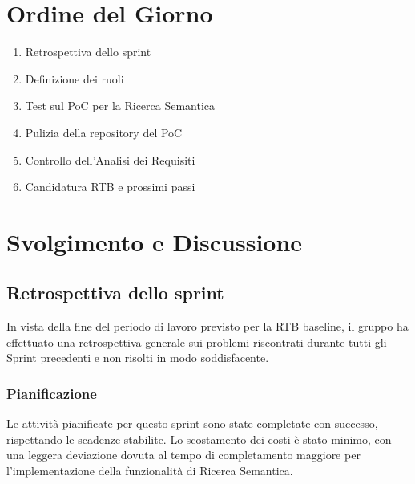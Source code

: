 \documentclass[a4paper,12pt]{article}
\begin{document}
\section{Ordine del Giorno}
\begin{enumerate}[noitemsep]
    \item Retrospettiva dello sprint 
    \item Definizione dei ruoli
    \item Test sul PoC per la Ricerca Semantica
    \item Pulizia della repository del PoC
    \item Controllo dell'Analisi dei Requisiti
    \item Candidatura RTB e prossimi passi
\end{enumerate}


\section{Svolgimento e Discussione}

\subsection{Retrospettiva dello sprint}
In vista della fine del periodo di lavoro previsto per la RTB baseline, il gruppo ha effettuato una retrospettiva generale sui problemi riscontrati durante tutti gli Sprint precedenti e non risolti in modo soddisfacente.

\subsubsection{Pianificazione}
Le attività pianificate per questo sprint sono state completate con successo, rispettando le scadenze stabilite. Lo scostamento dei costi è stato minimo, con una leggera deviazione dovuta al tempo di completamento maggiore per l'implementazione della funzionalità di Ricerca Semantica.
\end{document}
